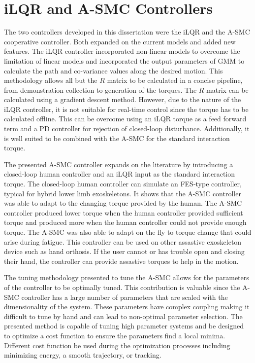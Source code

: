 \section{iLQR and A-SMC Controllers}

The two controllers developed in this dissertation were the iLQR and the A-SMC cooperative controller. Both expanded on the current models and added new features. The iLQR controller incorporated non-linear models to overcome the limitation of linear models and incorporated the output parameters of GMM to calculate the path and co-variance values along the desired motion. This methodology allows all but the $R$ matrix to be calculated in a concise pipeline, from demonstration collection to generation of the torques. The $R$ matrix can be calculated using a gradient descent method. However, due to the nature of the iLQR controller, it is not suitable for real-time control since the torque has to be calculated offline. This can be overcome using an iLQR torque as a feed forward term and a PD controller for rejection of closed-loop disturbance. Additionally, it is well suited to be combined with the A-SMC for the standard interaction torque. 

The presented A-SMC controller expands on the literature by introducing a closed-loop human controller and an iLQR input as the standard interaction torque. The closed-loop human controller can simulate an FES-type controller, typical for hybrid lower limb exoskeletons. It shows that the A-SMC controller was able to adapt to the changing torque provided by the human. The A-SMC controller produced lower torque when the human controller provided sufficient torque and produced more when the human controller could not provide enough torque. The A-SMC was also able to adapt on the fly to torque change that could arise during fatigue. This controller can be used on other assastive exoskeleton device such as hand orthosis. If the user cannot or has trouble open and closing their hand, the controller can provide assastive torques to help in the motion. 

The tuning methodology presented to tune the A-SMC allows for the 
parameters of the controller to be optimally tuned. This contribution is valuable since the A-SMC controller has a large number of parameters that are scaled with the dimensionality of the system. These parameters have complex coupling making it difficult to tune by hand and can lead to non-optimal parameter selection. The presented method is capable of tuning high parameter systems and be designed to optimize a cost function to ensure the parameters find a local minima. Different cost function be used during the optimization processes including minimizing energy,  a smooth trajectory, or tracking.   

